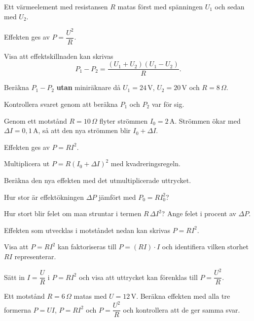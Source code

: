 Ett värmeelement med resistansen $R$ matas först med spänningen $U_1$ och sedan med $U_2$.


Effekten ges av $P = \dfrac{U^2}{R}$.
\begin{parts}
  \item Visa att effektskillnaden kan skrivas
    \[
      P_1 - P_2 = \frac{(U_1 + U_2)(U_1 - U_2)}{R}.
    \]
  \item Beräkna $P_1 - P_2$ \textbf{utan} miniräknare då $U_1 = 24\,\text{V}$,
    $U_2 = 20\,\text{V}$ och $R = 8\,\Omega$.
  \item Kontrollera svaret genom att beräkna $P_1$ och $P_2$ var för sig.
\end{parts}

Genom ett motstånd $R = 10\,\Omega$ flyter strömmen $I_0 = 2\,\text{A}$. Strömmen ökar med
$\Delta I = 0{,}1\,\text{A}$, så att den nya strömmen blir $I_0 + \Delta I$.


Effekten ges av $P = RI^2$.
\begin{parts}
  \item Multiplicera ut $P = R(I_0 + \Delta I)^2$ med kvadreringsregeln.
  \item Beräkna den nya effekten med det utmultiplicerade uttrycket.
  \item Hur stor är effektökningen $\Delta P$ jämfört med $P_0 = RI_0^2$?
  \item Hur stort blir felet om man struntar i termen $R\,\Delta I^2$? Ange felet i procent av
    $\Delta P$.
\end{parts}

Effekten som utvecklas i motståndet nedan kan skrivas $P = RI^2$.


\begin{parts}
  \item Visa att $P = RI^2$ kan faktoriseras till $P = (RI) \cdot I$ och identifiera vilken storhet
    $RI$ representerar.
  \item Sätt in $I = \dfrac{U}{R}$ i $P = RI^2$ och visa att uttrycket kan förenklas till
    $P = \dfrac{U^2}{R}$.
  \item Ett motstånd $R = 6\,\Omega$ matas med $U = 12\,\text{V}$. Beräkna effekten med alla tre
    formerna $P = UI$, $P = RI^2$ och $P = \dfrac{U^2}{R}$ och kontrollera att de ger samma svar.
\end{parts}

